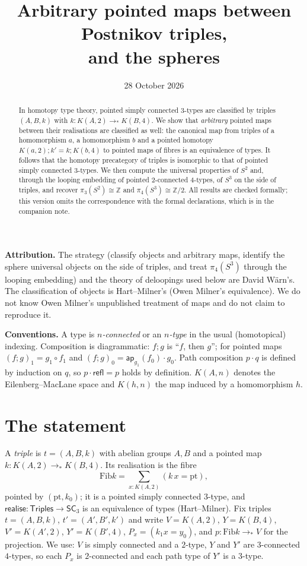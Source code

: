 \documentclass[11pt]{amsart}
\title{Arbitrary pointed maps between Postnikov triples,\\ and the spheres}
\date{28 October 2026}
\theoremstyle{definition}
\theoremstyle{remark}
\newcommand{\refl}{\mathsf{refl}}
\newcommand{\ap}{\mathsf{ap}}
\newcommand{\Fib}{\mathrm{Fib}}
\newcommand{\SCt}{\mathsf{SC}_3}
\newcommand{\Tri}{\mathsf{Triples}}
\newcommand{\real}{\mathsf{realise}}
\newcommand{\Z}{\mathbb{Z}}
\newcommand{\cmp}{\mathbin{;}}
\begin{document}
\maketitle
\setlength{\emergencystretch}{2em}

\begin{abstract}
In homotopy type theory, pointed simply connected $3$-types are classified by
triples $(A,B,k)$ with $k:K(A,2)\to_*K(B,4)$. We show that \emph{arbitrary}
pointed maps between their realisations are classified as well: the canonical
map from triples of a homomorphism $a$, a homomorphism $b$ and a pointed
homotopy $K(a,2)\cmp k'=k\cmp K(b,4)$ to pointed maps of fibres is an
equivalence of types. It follows that the homotopy precategory of triples is
isomorphic to that of pointed simply connected $3$-types. We then compute the
universal properties of $S^2$ and, through the looping embedding of pointed
$2$-connected $4$-types, of $S^3$ on the side of triples, and recover
$\pi_3(S^2)\cong\Z$ and $\pi_4(S^3)\cong\Z/2$. All results are checked
formally; this version omits the correspondence with the formal declarations,
which is in the companion note.
\end{abstract}

\noindent\textbf{Attribution.} The strategy (classify objects and arbitrary
maps, identify the sphere universal objects on the side of triples, and treat
$\pi_4(S^3)$ through the looping embedding) and the theory of deloopings used
below are David Wärn's. The classification of objects is Hart--Milner's (Owen
Milner's equivalence). We do not know Owen Milner's unpublished treatment of
maps and do not claim to reproduce it.

\noindent\textbf{Conventions.} A type is \emph{$n$-connected} or an
\emph{$n$-type} in the usual (homotopical) indexing. Composition is
diagrammatic: $f\cmp g$ is ``$f$, then $g$''; for pointed maps
$(f\cmp g)_1=g_1\circ f_1$ and $(f\cmp g)_0=\ap_{g_1}(f_0)\cdot g_0$. Path
composition $p\cdot q$ is defined by induction on $q$, so $p\cdot\refl=p$
holds by definition. $K(A,n)$ denotes the Eilenberg--MacLane space and
$K(h,n)$ the map induced by a homomorphism $h$.

\section{The statement}

A \emph{triple} is $t=(A,B,k)$ with abelian groups $A,B$ and a pointed map
$k:K(A,2)\to_*K(B,4)$. Its realisation is the fibre
\[\Fib k=\textstyle\sum_{x:K(A,2)}(k\,x=\mathrm{pt}),\]
pointed by $(\mathrm{pt},k_0)$; it is a pointed simply connected $3$-type, and
$\real:\Tri\to\SCt$ is an equivalence of types (Hart--Milner). Fix triples
$t=(A,B,k)$, $t'=(A',B',k')$ and write $V=K(A,2)$, $Y=K(B,4)$, $V'=K(A',2)$,
$Y'=K(B',4)$, $P_x=(k_1x=y_0)$, and $p:\Fib k\to_*V$ for the projection. We use:
$V$ is simply connected and a $2$-type, $Y$ and $Y'$ are $3$-connected
$4$-types, so each $P_x$ is $2$-connected and each path type of $Y'$ is a
$3$-type.
\end{document}
